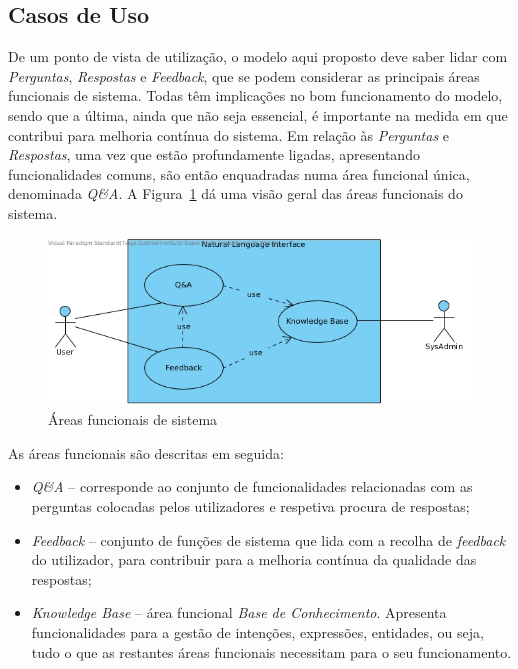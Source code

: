 \subsection{Casos de Uso}
De um ponto de vista de utilização, o modelo aqui proposto deve saber lidar com \textit{Perguntas}, \textit{Respostas} e \textit{Feedback}, que se podem considerar as principais áreas funcionais de sistema. Todas têm implicações no bom funcionamento do modelo, sendo que a última, ainda que não seja essencial, é importante na medida em que contribui para melhoria contínua do sistema. Em relação às \textit{Perguntas} e \textit{Respostas}, uma vez que estão profundamente ligadas, apresentando funcionalidades comuns, são então enquadradas numa área funcional única, denominada \textit{Q\&A}. A Figura~\ref{fig:use_cases} dá uma visão geral das áreas funcionais do sistema.
%
\begin{figure}
    \centering
    \includegraphics[width=.9\textwidth]{ch04/assets/use-cases.jpg}
    \caption{Áreas funcionais de sistema}
    \label{fig:use_cases}
\end{figure}

As áreas funcionais são descritas em seguida:

\begin{itemize}
    \item 
    {
        \textit{Q\&A} -- corresponde ao conjunto de funcionalidades relacionadas com as perguntas colocadas pelos utilizadores e respetiva procura de respostas;
    }
    \item 
    {
        \textit{Feedback} -- conjunto de funções de sistema que lida com a recolha de \textit{feedback} do utilizador, para contribuir para a melhoria contínua da qualidade das respostas;
    }
    \item 
    {
        \textit{Knowledge Base} -- área funcional \textit{Base de Conhecimento}. Apresenta funcionalidades para a gestão de intenções, expressões, entidades, ou seja, tudo o que as restantes áreas funcionais necessitam para o seu funcionamento.
    }
\end{itemize}

